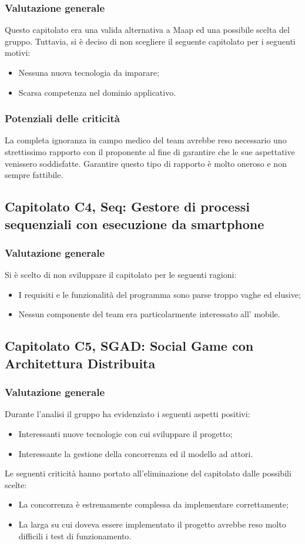 \subsubsection{Valutazione generale}
Questo capitolato era una valida alternativa a Maap ed una possibile scelta del gruppo. Tuttavia, si è deciso di non scegliere il seguente capitolato per i seguenti motivi:
\begin{itemize}
\item Nessuna nuova tecnologia da imparare;
\item Scarsa competenza nel dominio applicativo.
\end{itemize}
\subsubsection{Potenziali delle criticità}
La completa ignoranza in campo medico del team avrebbe reso necessario uno strettissimo rapporto con il proponente al fine di garantire che le sue aspettative venissero soddisfatte. Garantire questo tipo di rapporto è molto oneroso e non sempre fattibile.
\subsection{Capitolato C4,  Seq: Gestore di processi sequenziali con esecuzione da smartphone}
\label{3.3}
\subsubsection{Valutazione generale}
Si è scelto di non sviluppare il capitolato per le seguenti ragioni:
\begin{itemize}
\item I requisiti e le funzionalità del programma sono parse troppo vaghe ed elusive;
\item Nessun componente del team era particolarmente interessato all' mobile.
\end{itemize}
\subsection{Capitolato C5,  SGAD: Social Game con Architettura Distribuita}
\label{3.5}
\subsubsection{Valutazione generale}
Durante l'analisi il gruppo ha evidenziato i seguenti aspetti positivi:
\begin{itemize}
\item Interessanti nuove tecnologie con cui sviluppare il progetto;
\item Interessante la gestione della concorrenza ed il modello ad attori.
\end{itemize}
Le seguenti criticità hanno portato all'eliminazione del capitolato dalle possibili scelte:
\begin{itemize}
\item La concorrenza è estremamente complessa da implementare correttamente;
\item La larga  su cui doveva essere implementato il progetto avrebbe reso molto difficili i test di funzionamento.
\end{itemize}
